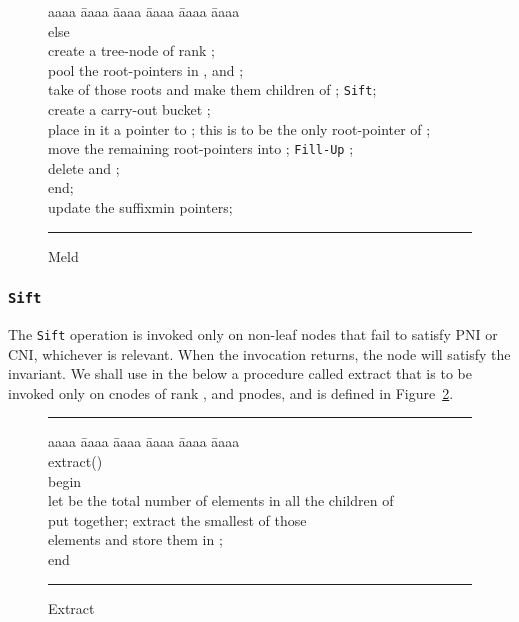 \begin{figure}
\begin{tabbing}
aaaa \= aaaa \= aaaa \= aaaa \= aaaa \= aaaa \kill \\
\>else \\
\>\>create a tree-node  of rank ; \\
\>\>pool the root-pointers in ,  and ; \\
\>\>take  of those roots and make them children of ; {\tt Sift}; \\
\>\>create a carry-out bucket ; \\ 
\>\>place in it a pointer to ; this is to be the only root-pointer of ; \\ 
\>\>move the remaining root-pointers into ; {\tt Fill-Up} ; \\
\>\>delete  and ; \\
end; \\
update the suffixmin pointers; \\
\end{tabbing}
\vspace{0.1in}
\hrule
\vspace{0.2in}
\caption{Meld}
\label{fig:meld}
\end{figure}

\subsubsection{{\tt Sift}}

The {\tt Sift} operation is invoked only on non-leaf nodes that fail to satisfy 
	PNI or CNI, whichever is relevant.
When the invocation returns, the node will satisfy the invariant.
We shall use in the below a procedure called
	extract that is to be invoked only on cnodes of rank , 
	and pnodes, and is defined in Figure~\ref{fig:extract}.

\begin{figure}[ht]
\vspace{0.2in}
\hrule
\begin{tabbing}
aaaa \= aaaa \= aaaa \= aaaa \= aaaa \= aaaa \kill \\
extract() \\
begin \\
\> let  be the total number of elements in all the children of  \\
\> put together; extract the smallest  of those \\
\> elements and store them in ; \\
end
\end{tabbing}
\vspace{0.1in}
\hrule
\vspace{0.2in}
\caption{Extract}
\label{fig:extract}
\end{figure}

